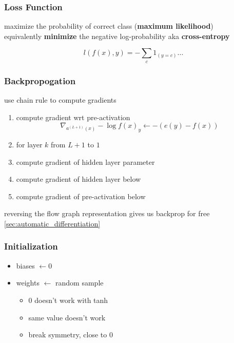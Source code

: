 \documentclass[]{article}
\theoremstyle{definition}
\begin{document}
    \subsubsection{Loss Function}%
    \label{ssub:loss_function}

    maximize the probability of correct class (\textbf{maximum likelihood}) \\
    equivalently \textbf{minimize} the negative log-probability aka \textbf{cross-entropy}

    \begin{equation*}
        l(f(x), y) = - \sum_c 1_(y=c) \ldots
    \end{equation*}

    \subsubsection{Backpropogation}%
    \label{ssub:backpropogation}

    use chain rule to compute gradients

    \begin{enumerate}
        \item compute gradient wrt pre-activation \\
            \begin{equation*}
                \nabla_{a^{(L+1)}(x)} - \log f(x)_y \gets - (e(y) - f(x))
            \end{equation*}
        \item[]for layer $k$ from $L+1$ to $1$
        \item compute gradient of hidden layer parameter
        \item compute gradient of hidden layer below
        \item compute gradient of pre-activation below
    \end{enumerate}

    reversing the flow graph representation gives us backprop for free \ref{sec:automatic_differentiation}


    \subsubsection{Initialization}%
    \label{ssub:initialization}

    \begin{itemize}
        \item biases $\gets 0$
        \item weights $\gets$ random sample
            \begin{itemize}
                \item 0 doesn't work with tanh
                \item same value doesn't work
                \item break symmetry, close to 0
            \end{itemize}
    \end{itemize}
\end{document}
